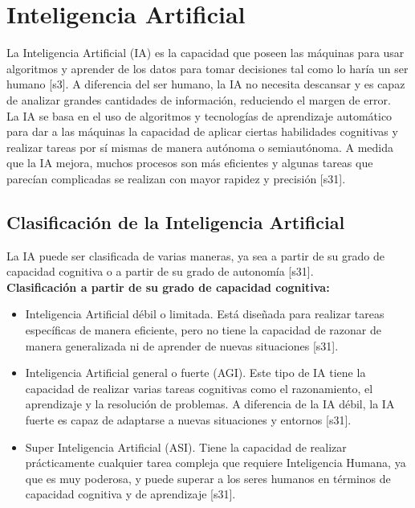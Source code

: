 \section{Inteligencia Artificial}
La Inteligencia Artificial (IA) es la capacidad que poseen las máquinas para usar algoritmos y aprender de los datos para tomar decisiones tal como lo haría un ser humano [s3]. A diferencia del ser humano, la IA no necesita descansar y es capaz de analizar grandes cantidades de información, reduciendo el margen de error.\\

La IA se basa en el uso de algoritmos y tecnologías de aprendizaje automático para dar a las máquinas la capacidad de aplicar ciertas habilidades cognitivas y realizar tareas por sí mismas de manera autónoma o semiautónoma. A medida que la IA mejora, muchos procesos son más eficientes y algunas tareas que parecían complicadas se realizan con mayor rapidez y precisión [s31].\\

\subsection{Clasificación de la Inteligencia Artificial}
La IA puede ser clasificada de varias maneras, ya sea a partir de su grado de capacidad cognitiva o a partir de su grado de autonomía [s31].\\

\textbf{Clasificación a partir de su grado de capacidad cognitiva:}
\begin{itemize}
    \item Inteligencia Artificial débil o limitada. Está diseñada para realizar tareas específicas de manera eficiente, pero no tiene la capacidad de razonar de manera generalizada ni de aprender de nuevas situaciones [s31].\\
\item Inteligencia Artificial general o fuerte (AGI). Este tipo de IA tiene la capacidad de realizar varias tareas cognitivas como el razonamiento, el aprendizaje y la resolución de problemas. A diferencia de la IA débil, la IA fuerte es capaz de adaptarse a nuevas situaciones y entornos [s31].\\
\item Super Inteligencia Artificial (ASI). Tiene la capacidad de realizar prácticamente cualquier tarea compleja que requiere Inteligencia Humana, ya que es muy poderosa, y puede superar a los seres humanos en términos de capacidad cognitiva y de aprendizaje [s31].

\end{itemize}

